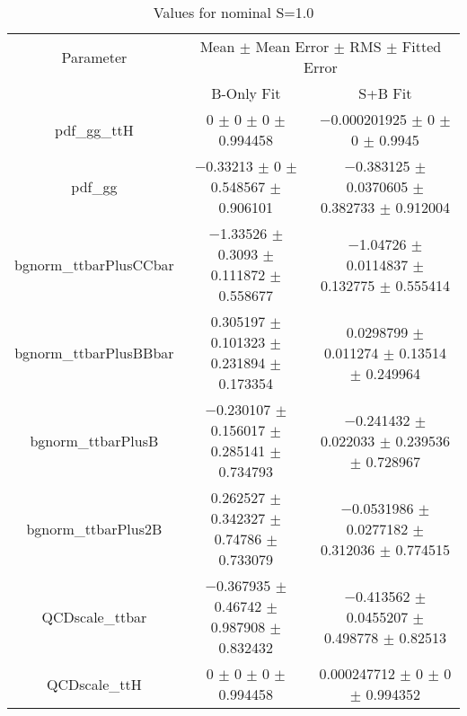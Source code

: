 \begin{table}
\centering
\caption{Values for nominal S=1.0}
\begin{tabular}{ccc}
\toprule
Parameter & \multicolumn{2}{c}{Mean $\pm$ Mean Error $\pm$ RMS $\pm$ Fitted Error}\\
 & B-Only Fit & S+B Fit\\
\midrule
pdf\_gg\_ttH & \num{0} $\pm$ \num{0} $\pm$ \num{0} $\pm$ \num{0.994458} & \num{-0.000201925} $\pm$ \num{0} $\pm$ \num{0} $\pm$ \num{0.9945}\\
pdf\_gg & \num{-0.33213} $\pm$ \num{0} $\pm$ \num{0.548567} $\pm$ \num{0.906101} & \num{-0.383125} $\pm$ \num{0.0370605} $\pm$ \num{0.382733} $\pm$ \num{0.912004}\\
bgnorm\_ttbarPlusCCbar & \num{-1.33526} $\pm$ \num{0.3093} $\pm$ \num{0.111872} $\pm$ \num{0.558677} & \num{-1.04726} $\pm$ \num{0.0114837} $\pm$ \num{0.132775} $\pm$ \num{0.555414}\\
bgnorm\_ttbarPlusBBbar & \num{0.305197} $\pm$ \num{0.101323} $\pm$ \num{0.231894} $\pm$ \num{0.173354} & \num{0.0298799} $\pm$ \num{0.011274} $\pm$ \num{0.13514} $\pm$ \num{0.249964}\\
bgnorm\_ttbarPlusB & \num{-0.230107} $\pm$ \num{0.156017} $\pm$ \num{0.285141} $\pm$ \num{0.734793} & \num{-0.241432} $\pm$ \num{0.022033} $\pm$ \num{0.239536} $\pm$ \num{0.728967}\\
bgnorm\_ttbarPlus2B & \num{0.262527} $\pm$ \num{0.342327} $\pm$ \num{0.74786} $\pm$ \num{0.733079} & \num{-0.0531986} $\pm$ \num{0.0277182} $\pm$ \num{0.312036} $\pm$ \num{0.774515}\\
QCDscale\_ttbar & \num{-0.367935} $\pm$ \num{0.46742} $\pm$ \num{0.987908} $\pm$ \num{0.832432} & \num{-0.413562} $\pm$ \num{0.0455207} $\pm$ \num{0.498778} $\pm$ \num{0.82513}\\
QCDscale\_ttH & \num{0} $\pm$ \num{0} $\pm$ \num{0} $\pm$ \num{0.994458} & \num{0.000247712} $\pm$ \num{0} $\pm$ \num{0} $\pm$ \num{0.994352}\\
\bottomrule
\end{tabular}
\end{table}